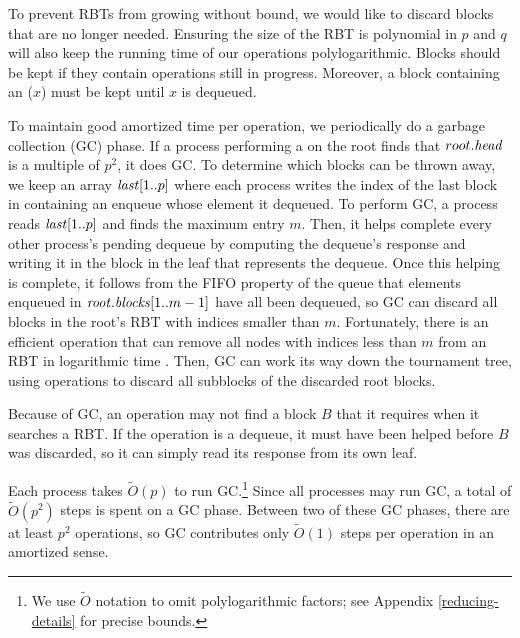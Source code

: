 To prevent RBTs from growing without bound, we would like to discard
blocks that are no longer needed.
Ensuring the size of the RBT is polynomial in $p$ and $q$ will 
also keep the running time of our operations polylogarithmic.
Blocks should be kept if they contain operations still in progress.
Moreover, a block containing an ($x$) must be kept until $x$ is dequeued.

To maintain good amortized time per operation, we periodically do a garbage collection (GC) phase.
If a process performing a  on the root finds that $root.\mbox{\textit{head}}$ is a multiple
of $p^2$, it does GC.
To determine which blocks can be thrown away, we keep an array $\mbox{\textnormal{\textit{last}}}[1..p]$ where 
each process writes the index of the last block in
 containing an enqueue whose element it dequeued.
To perform GC, a process reads $\mbox{\textnormal{\textit{last}}}[1..p]$ and finds the maximum entry $m$.
Then, it helps complete every other process's pending dequeue 
by computing the dequeue's response and writing it in the block in the leaf that represents the dequeue.
Once this helping is complete, it follows from the FIFO property of the queue that elements enqueued 
in $\mbox{\textnormal{\textit{root}}}.\mbox{\textit{blocks}}[1..m-1]$ have all been dequeued, so GC can discard all blocks in the root's RBT 
with indices smaller than $m$.
Fortunately, there is an efficient  operation that can remove
all nodes with indices less than $m$ from an RBT in logarithmic time \cite[Sec.~4.2]{Tar83}.
Then, GC can work its way down the tournament tree, using  operations to discard all subblocks
of the discarded root blocks.


Because of GC, an operation may not find a block $B$ that it requires when it searches a RBT.  If the operation
is a dequeue, it must have been helped before $B$ was discarded, so it can simply read its response from
its own leaf.

Each process takes $\tilde{O}(p)$ to run GC.\footnote{We use $\tilde{O}$ notation
to omit polylogarithmic factors; see Appendix \ref{reducing-details} for precise bounds.}
Since all processes may run GC,
a total of $\tilde{O}(p^2)$ steps is spent on a GC phase.
Between two of these GC phases, there are at least $p^2$ operations, so
GC contributes only $\tilde{O}(1)$ steps per operation in an amortized sense.


